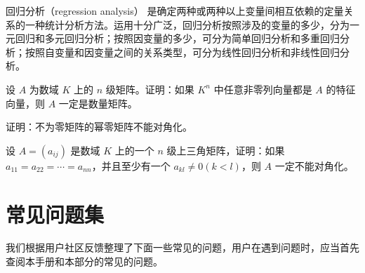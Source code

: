 \documentclass[lang=cn,newtx,10pt,scheme=chinese,pad,twocol]{zznote}
\begin{document}
\begin{conclusion}
	回归分析（regression analysis） 是确定两种或两种以上变量间相互依赖的定量关系的一种统计分析方法。运用十分广泛，回归分析按照涉及的变量的多少，分为一元回归和多元回归分析；按照因变量的多少，可分为简单回归分析和多重回归分析；按照自变量和因变量之间的关系类型，可分为线性回归分析和非线性回归分析。
\end{conclusion}

\begin{problemset}
	\item 设 $A$ 为数域 $K$ 上的 $n$ 级矩阵。证明：如果 $K^n$ 中任意非零列向量都是 $A$ 的特征向量，则 $A$ 一定是数量矩阵。
	\item 证明：不为零矩阵的幂零矩阵不能对角化。
	\item 设 $A = (a_{ij})$ 是数域 $K$ 上的一个 $n$ 级上三角矩阵，证明：如果 $a_{11} = a_{22} = \cdots = a_{nn}$，并且至少有一个 $a_{kl} \not = 0 (k < l)$，则 $A$ 一定不能对角化。
\end{problemset}

\chapter{常见问题集}

我们根据用户社区反馈整理了下面一些常见的问题，用户在遇到问题时，应当首先查阅本手册和本部分的常见的问题。
\end{document}

